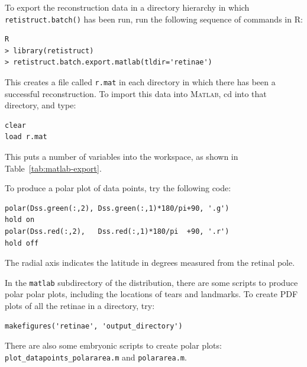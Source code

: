 \documentclass{article}
\begin{document}
To export the reconstruction data in a directory hierarchy in which
\texttt{retistruct.batch()} has been run, run the following sequence
of commands in R:
\begin{verbatim}
R
> library(retistruct)
> retistruct.batch.export.matlab(tldir='retinae')
\end{verbatim}
This creates a file called \texttt{r.mat} in each directory in which
there has been a successful reconstruction. To import this data into
\textsc{Matlab}, cd into that directory, and type:
\begin{verbatim}
clear
load r.mat
\end{verbatim}
This puts a number of variables into the workspace, as shown in
Table~\ref{tab:matlab-export}.

To produce a polar plot of data points, try the following code:
\begin{verbatim}
polar(Dss.green(:,2), Dss.green(:,1)*180/pi+90, '.g')
hold on
polar(Dss.red(:,2),   Dss.red(:,1)*180/pi  +90, '.r')
hold off
\end{verbatim}
The radial axis indicates the latitude in degrees measured from the
retinal pole.

In the \texttt{matlab} subdirectory of the distribution, there are
some scripts to produce polar polar plots, including the locations of
tears and landmarks. To create PDF plots of all the retinae in a
directory, try:
\begin{verbatim}
makefigures('retinae', 'output_directory')
\end{verbatim}

There are also some embryonic scripts to create polar plots:
\texttt{plot\_datapoints\_polararea.m} and \texttt{polararea.m}.
\end{document}
